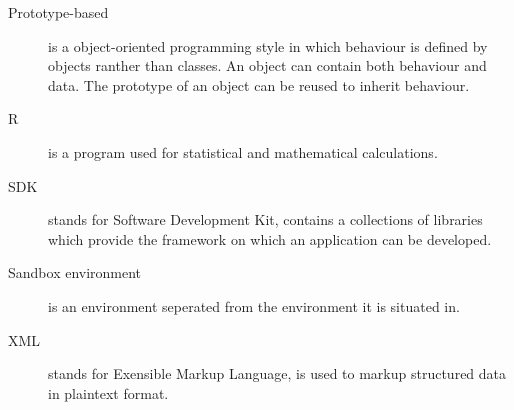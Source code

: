 \begin{description}
\item[Prototype-based] is a object-oriented programming style in which behaviour is defined by objects ranther than classes. An object can contain both behaviour and data. The prototype of an object can be reused to inherit behaviour.

\item[R] is a program used for statistical and mathematical calculations.

\item[SDK] stands for Software Development Kit, contains a collections of libraries which provide the framework on which an application can be developed.

\item[Sandbox environment] is an environment seperated from the environment it is situated in.

\item[XML] stands for Exensible Markup Language, is used to markup structured data in plaintext format.


\end{description}